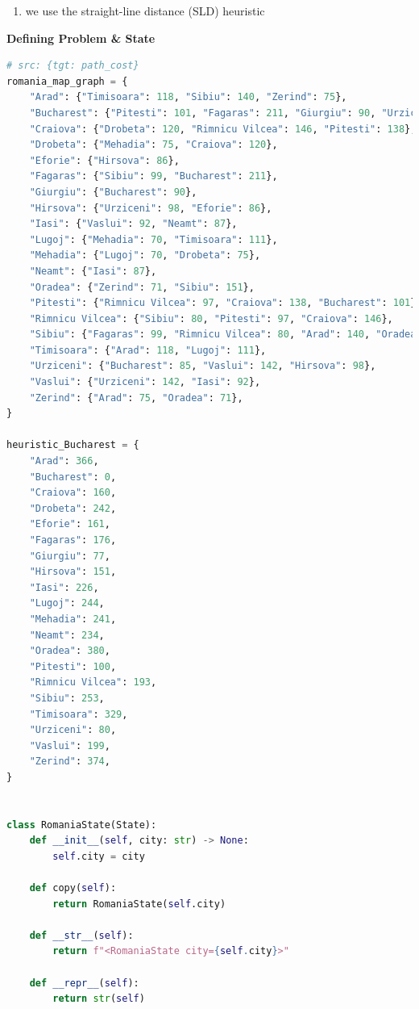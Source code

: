 \begin{enumerate}
    \item we use the straight-line distance (SLD) heuristic
    \hfill \cite{ai/book/Artificial-Intelligence-A-Modern-Approach/Russell-Norvig}
\end{enumerate}


\vspace{0.5cm}

{\centering \textbf{Defining Problem \& State} \par}

\begin{lstlisting}[language=Python]
# src: {tgt: path_cost}
romania_map_graph = {
    "Arad": {"Timisoara": 118, "Sibiu": 140, "Zerind": 75},
    "Bucharest": {"Pitesti": 101, "Fagaras": 211, "Giurgiu": 90, "Urziceni": 85},
    "Craiova": {"Drobeta": 120, "Rimnicu Vilcea": 146, "Pitesti": 138},
    "Drobeta": {"Mehadia": 75, "Craiova": 120},
    "Eforie": {"Hirsova": 86},
    "Fagaras": {"Sibiu": 99, "Bucharest": 211},
    "Giurgiu": {"Bucharest": 90},
    "Hirsova": {"Urziceni": 98, "Eforie": 86},
    "Iasi": {"Vaslui": 92, "Neamt": 87},
    "Lugoj": {"Mehadia": 70, "Timisoara": 111},
    "Mehadia": {"Lugoj": 70, "Drobeta": 75},
    "Neamt": {"Iasi": 87},
    "Oradea": {"Zerind": 71, "Sibiu": 151},
    "Pitesti": {"Rimnicu Vilcea": 97, "Craiova": 138, "Bucharest": 101},
    "Rimnicu Vilcea": {"Sibiu": 80, "Pitesti": 97, "Craiova": 146},
    "Sibiu": {"Fagaras": 99, "Rimnicu Vilcea": 80, "Arad": 140, "Oradea": 151},
    "Timisoara": {"Arad": 118, "Lugoj": 111},
    "Urziceni": {"Bucharest": 85, "Vaslui": 142, "Hirsova": 98},
    "Vaslui": {"Urziceni": 142, "Iasi": 92},
    "Zerind": {"Arad": 75, "Oradea": 71},
}

heuristic_Bucharest = {
    "Arad": 366,
    "Bucharest": 0,
    "Craiova": 160,
    "Drobeta": 242,
    "Eforie": 161,
    "Fagaras": 176,
    "Giurgiu": 77,
    "Hirsova": 151,
    "Iasi": 226,
    "Lugoj": 244,
    "Mehadia": 241,
    "Neamt": 234,
    "Oradea": 380,
    "Pitesti": 100,
    "Rimnicu Vilcea": 193,
    "Sibiu": 253,
    "Timisoara": 329,
    "Urziceni": 80,
    "Vaslui": 199,
    "Zerind": 374,
}


class RomaniaState(State):
    def __init__(self, city: str) -> None:
        self.city = city

    def copy(self):
        return RomaniaState(self.city)

    def __str__(self):
        return f"<RomaniaState city={self.city}>"

    def __repr__(self):
        return str(self)


\end{lstlisting}

